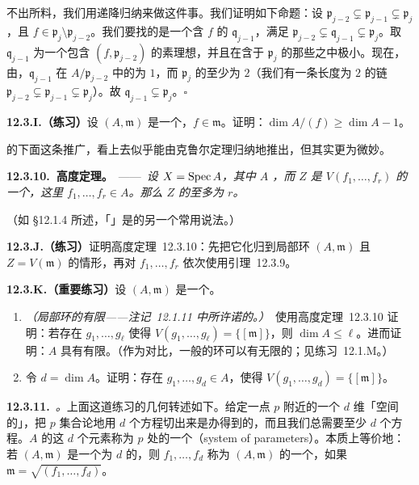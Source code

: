 不出所料，我们用递降归纳来做这件事。我们证明如下命题：设 $\mathfrak{p}_{j-2}\subsetneq\mathfrak{p}_{j-1}\subsetneq\mathfrak{p}_j$，且 $f\in\mathfrak{p}_j\setminus\mathfrak{p}_{j-2}$。我们要找的是一个含 $f$ 的\trPrimeIdeal{} $\mathfrak{q}_{j-1}$，满足 $\mathfrak{p}_{j-2}\subsetneq\mathfrak{q}_{j-1}\subsetneq\mathfrak{p}_j$。取 $\mathfrak{q}_{j-1}$ 为一个包含 $(f,\mathfrak{p}_{j-2})$ 的素理想，并且在含于 $\mathfrak{p}_j$ 的那些之中极小。现在，由\trKrull{}\trPrincipalIdealTheorem，$\mathfrak{q}_{j-1}$ 在 $A/\mathfrak{p}_{j-2}$ 中的\trCodimension{}为 $1$，而 $\mathfrak{p}_j$ 的\trCodimension{}至少为 $2$（我们有一条长度为 $2$ 的链 $\mathfrak{p}_{j-2}\subsetneq\mathfrak{p}_{j-1}\subsetneq\mathfrak{p}_j$）。故 $\mathfrak{q}_{j-1}\subsetneq\mathfrak{p}_j$。\hfill$\square$

\textbf{12.3.I.（练习）}\quad 设 $(A,\mathfrak{m})$ 是一个\trNoetherian\trLocalRing，$f\in\mathfrak{m}$。证明：$\dim A/(f)\ge\dim A-1$。

\trKrull{}\trPrincipalIdealTheorem{}的下面这条推广，看上去似乎能由克鲁尔定理归纳地推出，但其实更为微妙。

\textbf{12.3.10.\ \trKrull{}高度定理。}\ ——\ \emph{设 $X=\operatorname{Spec} A$，其中 $A$ \trNoetherian，而 $Z$ 是 $V(f_1,\dots,f_r)$ 的一个\trIrreducibleComponent，这里 $f_1,\dots,f_r\in A$。那么 $Z$ 的\trCodimension{}至多为 $r$。}

（如 \S12.1.4 所述，「\trHeight」是\trCodimension{}的另一个常用说法。）

\textbf{12.3.J.（练习）}\quad 证明\trKrull{}高度定理~12.3.10：先把它化归到\trNoetherian{}局部环 $(A,\mathfrak{m})$ 且 $Z=V(\mathfrak{m})$ 的情形，再对 $f_1,\dots,f_r$ 依次使用引理~12.3.9。

\textbf{12.3.K.（重要练习）}\quad 设 $(A,\mathfrak{m})$ 是一个\trNoetherian\trLocalRing。
\begin{enumerate}[label=(\alph*)]
\item \emph{（\trNoetherian{}局部环的\trDimension{}有限——注记~12.1.11 中所许诺的。）}\ 使用\trKrull{}高度定理~12.3.10 证明：若存在 $g_1,\dots,g_\ell$ 使得 $V(g_1,\dots,g_\ell)=\{[\mathfrak{m}]\}$，则 $\dim A\le\ell$。进而证明：$A$ 具有有限\trDimension。（作为对比，一般的\trNoetherian{}环可以有无限的\trDimension；见\mbox{练习~12.1.M}。）
\item 令 $d=\dim A$。证明：存在 $g_1,\dots,g_d\in A$，使得 $V(g_1,\dots,g_d)=\{[\mathfrak{m}]\}$。
\end{enumerate}

\textbf{12.3.11.}\ \emph{\trhDefinition{}。}\quad 上面这道练习的几何转述如下。给定一点 $p$ 附近的一个 $d$ 维「\trReasonable{}空间的\trGerm」，把 $p$ 集合论地用 $d$ 个方程切出来是办得到的，而且我们总需要至少 $d$ 个方程。$A$ 的这 $d$ 个元素称为 $p$ 处的一个\textbf{\trSystemOfParameters}（system of parameters）。本质上等价地：若 $(A,\mathfrak{m})$ 是一个\trDimension{}为 $d$ 的\trNoetherian\trLocalRing，则 $f_1,\dots,f_d$ 称为 $(A,\mathfrak{m})$ 的一个\textbf{\trSystemOfParameters}，如果 $\mathfrak{m}=\sqrt{(f_1,\dots,f_d)}$。

